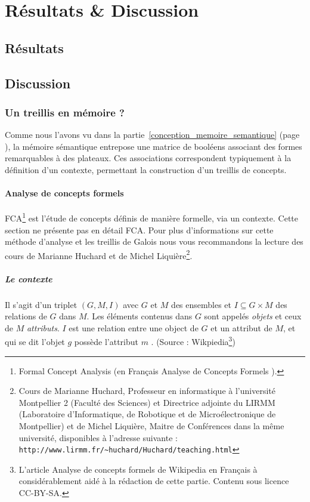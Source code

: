 \clearemptydoublepage
\chapter{Résultats \& Discussion}

\section{Résultats}



\section{Discussion}
\subsection{Un treillis en mémoire ?}
Comme nous l'avons vu dans la partie~\ref{conception_memoire_semantique} (page \pageref{conception_memoire_semantique}), la mémoire sémantique entrepose une matrice de booléens associant des formes remarquables à des plateaux. Ces associations correspondent typiquement à la définition d'un contexte, permettant la construction d'un treillis de concepts.

\subsubsection{Analyse de concepts formels}
FCA\footnote{Formal Concept Analysis (en Français \og Analyse de Concepts Formels \fg{}).} est l'étude de concepts définis de manière formelle, via un contexte. Cette section ne présente pas en détail FCA. Pour plus d'informations sur cette méthode d'analyse et les treillis de Galois nous vous recommandons la lecture des cours de Marianne Huchard et de Michel Liquière\footnote{Cours de Marianne Huchard, Professeur en informatique à l'université Montpellier 2 (Faculté des Sciences) et Directrice adjointe du LIRMM (Laboratoire d'Informatique, de Robotique et de Microélectronique de Montpellier) et de Michel Liquière, Maitre de Conférences dans la même université, disponibles à l'adresse suivante : \texttt{http://www.lirmm.fr/\textasciitilde huchard/Huchard/teaching.html}}.

\paragraph{Le contexte} Il s'agit d'un triplet $(G,M,I)$ avec $G$ et $M$ des ensembles et $I\subseteq G \times M$ des relations de $G$ dans $M$. Les éléments contenus dans $G$ sont appelés \emph{objets} et ceux de $M$ \emph{attributs}. $I$ est une relation entre une object de $G$ et un attribut de $M$, et qui se dit \og l'objet $g$ possède l'attribut $m$ \fg{}. (Source : Wikpiedia\footnote{L'article \og Analyse de concepts formels \fg{} de Wikipedia en Français à considérablement aidé à la rédaction de cette partie. Contenu sous licence CC-BY-SA.})

